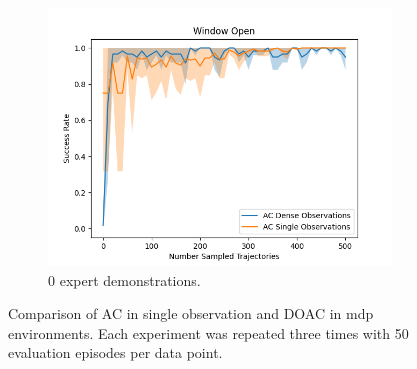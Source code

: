 \begin{figure}[htbp]
\begin{subfigure}[t]{0.32\textwidth}
    \includegraphics[width=\textwidth]{images/dense_vs_sparse_0/Window Open.png}
    \caption{0 expert demonstrations.}
  \end{subfigure}
  \caption{Comparison of AC in single observation and DOAC in mdp environments. Each experiment was repeated three times with 50 evaluation episodes per data point.
  }
  \label{fig:dense_vs_single}
\end{figure}
